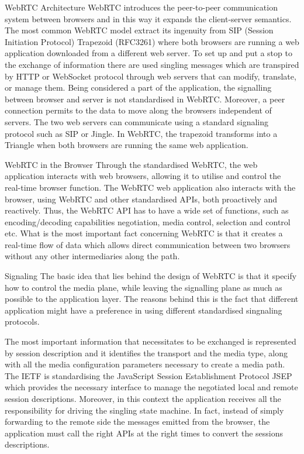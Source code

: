 WebRTC Architecture
WebRTC introduces the peer-to-peer communication system between browsers and in this way it expands the client-server semantics. The most common WebRTC model extract its ingenuity from 
SIP (Session Initiation Protocol) Trapezoid (RFC3261) where both  browsers are running a web application downloaded from a different web server. To set up and put a stop to the exchange of information there are used singling messages which are transpired by HTTP or WebSocket protocol through web servers that can modify, translate, or manage them. Being considered a part of the application, the signalling between browser and server is not standardised in WebRTC. Moreover, a peer connection permits to the data to move along the browsers independent of servers. The two web servers can communicate using a standard signaling protocol such as SIP or Jingle. In WebRTC, the trapezoid transforms into a Triangle when both browsers are running the same web application. 

WebRTC in the Browser 
Through the standardised WebRTC, the web application interacts with web browsers, allowing it to utilise and control the real-time browser function. The WebRTC web application also interacts with the browser, using WebRTC and other standardised APIs, both proactively and reactively. Thus, the WebRTC API has to have a wide set of functions, such as encoding/decoding capabilities negotiation, media control, selection and control etc. What is the most important fact concerning WebRTC  is that it creates a real-time flow of data which allows direct communication between two browsers without any other intermediaries along the path. 

 Signaling 
The basic idea that lies behind the design of WebRTC is that it specify how to control the media plane, while leaving the signalling plane as much as possible to the application layer. The reasons behind this is the fact that different application might have a preference in using different standardised singnaling protocols. 

The most important information that necessitates to be exchanged is represented by session description and it identifies the transport and the media type, along with all the media configuration parameters necessary to create a media path. The IETF is standardising the JavaScript Session Establishment Protocol JSEP which  provides the necessary interface 
 to manage the negotiated local and remote session descriptions. Moreover, in this context the application receives all the responsibility for driving the singling state machine. In fact, instead of simply forwarding to the remote side the messages emitted from the browser, the application must call the right APIs at the right times to convert the sessions descriptions. 

